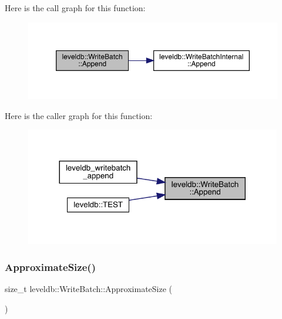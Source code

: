 Here is the call graph for this function\+:
\nopagebreak
\begin{figure}[H]
\begin{center}
\leavevmode
\includegraphics[width=350pt]{classleveldb_1_1_write_batch_a90424a9947fb7501eec2c31acf96e27f_cgraph}
\end{center}
\end{figure}
Here is the caller graph for this function\+:
\nopagebreak
\begin{figure}[H]
\begin{center}
\leavevmode
\includegraphics[width=317pt]{classleveldb_1_1_write_batch_a90424a9947fb7501eec2c31acf96e27f_icgraph}
\end{center}
\end{figure}
\mbox{\label{classleveldb_1_1_write_batch_ab6fef29a45e54ede38138dea327b8051}} 
\subsubsection{\texorpdfstring{ApproximateSize()}{ApproximateSize()}}
{\footnotesize\ttfamily size\+\_\+t leveldb\+::\+Write\+Batch\+::\+Approximate\+Size (\begin{DoxyParamCaption}{ }\end{DoxyParamCaption})}

